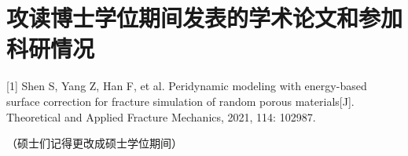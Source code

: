 \chapter*{攻读博士学位期间发表的学术论文和参加科研情况} %
\newlength{\oldparindent}
\setlength{\oldparindent}{\parindent}
\setlength{\parindent}{0pt}

[1]	Shen S, Yang Z, Han F, et al. Peridynamic modeling with energy-based surface correction for fracture simulation of random porous materials[J]. Theoretical and Applied Fracture Mechanics, 2021, 114: 102987.

\setlength{\parindent}{\oldparindent}
（硕士们记得更改成硕士学位期间）

\clearpage
\endinput